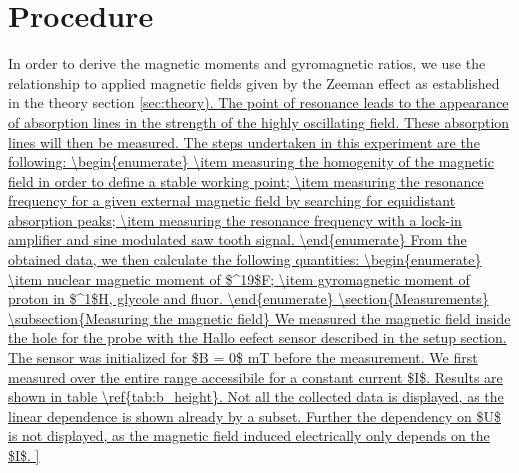 \section{Procedure}
\label{sec:procedure}
In order to derive the magnetic moments and gyromagnetic ratios, 
we use the relationship to applied magnetic fields given by the Zeeman effect 
as established in the theory section \ref{sec:theory). 
The point of resonance leads to the appearance of absorption lines 
in the strength of the highly oscillating field. These absorption lines 
will then be measured. 
The steps undertaken in this experiment are the following:
\begin{enumerate}
\item
measuring the homogenity of the magnetic field in order to define a stable working point;
\item
measuring the resonance frequency for a given external magnetic field by searching for 
equidistant absorption peaks;
\item
measuring the resonance frequency with a lock-in amplifier and sine modulated saw tooth signal.
\end{enumerate}
From the obtained data, we then calculate the following quantities:
\begin{enumerate}
\item
nuclear magnetic moment of $^19$F;
\item
gyromagnetic moment of proton in $^1$H, glycole and fluor.
\end{enumerate}


\section{Measurements}

\subsection{Measuring the magnetic field}
We measured the magnetic field inside the hole for the probe with the Hallo eefect sensor described in the setup section. 
The sensor was initialized for $B = 0$ mT before the measurement. We first measured over the 
entire range accessibile for a constant current $I$. Results are shown in table \ref{tab:b_height}. 
Not all the collected data is displayed, as the linear dependence is shown already by a subset. Further 
the dependency on $U$ is not displayed, as the magnetic field induced electrically only depends on the 
$I$.


}

